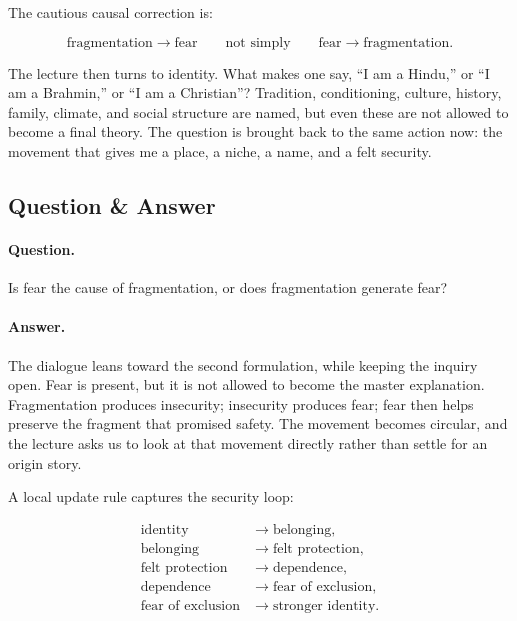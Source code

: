 The cautious causal correction is:

\begin{equation}
\text{fragmentation}
\longrightarrow
\text{fear}
\qquad
\text{not simply}
\qquad
\text{fear}
\longrightarrow
\text{fragmentation}.
\end{equation}

The lecture then turns to identity. What makes one say, ``I am a Hindu,'' or ``I am a Brahmin,'' or ``I am a Christian''? Tradition, conditioning, culture, history, family, climate, and social structure are named, but even these are not allowed to become a final theory. The question is brought back to the same action now: the movement that gives me a place, a niche, a name, and a felt security.

\subsection{Question \& Answer}

\paragraph{Question.}
Is fear the cause of fragmentation, or does fragmentation generate fear?

\paragraph{Answer.}
The dialogue leans toward the second formulation, while keeping the inquiry open. Fear is present, but it is not allowed to become the master explanation. Fragmentation produces insecurity; insecurity produces fear; fear then helps preserve the fragment that promised safety. The movement becomes circular, and the lecture asks us to look at that movement directly rather than settle for an origin story.

A local update rule captures the security loop:

\begin{align}
\text{identity} &\longrightarrow \text{belonging},\\
\text{belonging} &\longrightarrow \text{felt protection},\\
\text{felt protection} &\longrightarrow \text{dependence},\\
\text{dependence} &\longrightarrow \text{fear of exclusion},\\
\text{fear of exclusion} &\longrightarrow \text{stronger identity}.
\end{align}

